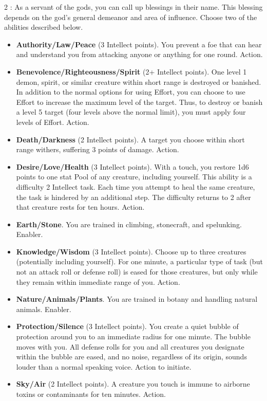 \begin{multicols}{2}
: As a servant of the gods, you can call up blessings in their name. This blessing depends on the god’s general demeanor and area of influence. Choose two of the abilities described below. 

\begin{itemize}
\item \textbf{Authority/Law/Peace} (3 Intellect points). You prevent a foe that can hear and understand you from attacking anyone or anything for one round. Action. 
\item \textbf{Benevolence/Righteousness/Spirit} (2+ Intellect points). One level 1 demon, spirit, or similar creature within short range is destroyed or banished. In addition to the normal options for using Effort, you can choose to use Effort to increase the maximum level of the target. Thus, to destroy or banish a level 5 target (four levels above the normal limit), you must apply four levels of Effort. Action. 
\item \textbf{Death/Darkness} (2 Intellect points). A target you choose within short range withers, suffering 3 points of damage. Action. 
\item \textbf{Desire/Love/Health} (3 Intellect points). With a touch, you restore 1d6 points to one stat Pool of any creature, including yourself. This ability is a difficulty 2 Intellect task. Each time you attempt to heal the same creature, the task is hindered by an additional step. The difficulty returns to 2 after that creature rests for ten hours. Action.
\item \textbf{Earth/Stone}. You are trained in climbing, stonecraft, and spelunking. Enabler. 
\item \textbf{Knowledge/Wisdom} (3 Intellect points). Choose up to three creatures (potentially including yourself). For one minute, a particular type of task (but not an attack roll or defense roll) is eased for those creatures, but only while they remain within immediate range of you. Action.
\item \textbf{Nature/Animals/Plants}. You are trained in botany and handling natural animals. Enabler. 
\item \textbf{Protection/Silence} (3 Intellect points). You create a quiet bubble of protection around you to an immediate radius for one minute. The bubble moves with you. All defense rolls for you and all creatures you designate within the bubble are eased, and no noise, regardless of its origin, sounds louder than a normal speaking voice. Action to initiate. 
\item \textbf{Sky/Air} (2 Intellect points). A creature you touch is immune to airborne toxins or contaminants for ten minutes. Action. 

\end{itemize}
\end{multicols}
